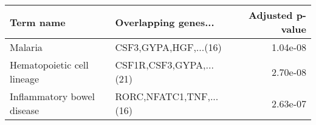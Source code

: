 \begin{tabular}{llr}
\toprule
                 Term name &    Overlapping genes... &  Adjusted p-value \\
\midrule
                   Malaria &   CSF3,GYPA,HGF,...(16) &          1.04e-08 \\
Hematopoietic cell lineage & CSF1R,CSF3,GYPA,...(21) &          2.70e-08 \\
Inflammatory bowel disease & RORC,NFATC1,TNF,...(16) &          2.63e-07 \\
\bottomrule
\end{tabular}
